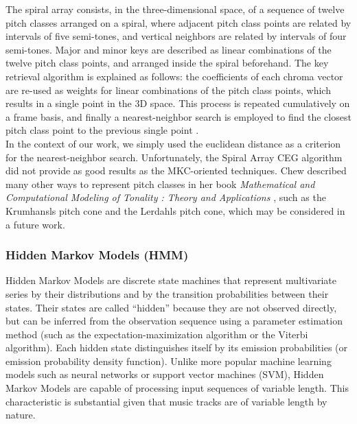\documentclass[letterpaper]{article}
\begin{document}
The spiral array consists, in the three-dimensional space, of a sequence of twelve pitch classes arranged on a spiral, where adjacent pitch class points are related by intervals of five semi-tones, and vertical neighbors are related by intervals of four semi-tones. Major and minor keys are described as linear combinations of the twelve pitch class points, and arranged inside the spiral beforehand. The key retrieval algorithm is explained as follows: the coefficients of each chroma vector are re-used as weights for linear combinations of the pitch class points, which results in a single point in the 3D space. This process is repeated cumulatively on a frame basis, and finally a nearest-neighbor search is employed to find the closest pitch class point to the previous single point \citep{MIDI}.\\

In the context of our work, we simply used the euclidean distance as a criterion for the nearest-neighbor search. Unfortunately, the Spiral Array CEG algorithm did not provide as good results as the MKC-oriented techniques. Chew described many other ways to represent pitch classes in her book \textit{Mathematical and Computational Modeling of Tonality : Theory and Applications} \citep{CHEW}, such as the Krumhansl\textquotesingle s pitch cone and the Lerdahl\textquotesingle s pitch cone, which may be considered in a future work.

\subsubsection{Hidden Markov Models (HMM)}
\label{sssec:hmm}

Hidden Markov Models are discrete state machines that represent multivariate series by their distributions and by
the transition probabilities between their states. Their states are called “hidden” because they are not observed directly,
but can be inferred from the observation sequence using a parameter estimation method (such as the expectation-maximization algorithm
or the Viterbi algorithm). Each hidden state distinguishes itself by its emission probabilities (or emission probability density function).
Unlike more popular machine learning models such as neural networks or support vector machines (SVM), Hidden Markov Models are capable of
processing input sequences of variable length. This characteristic is substantial given that music tracks are of variable length by nature\citep{DR}. \\
\end{document}
